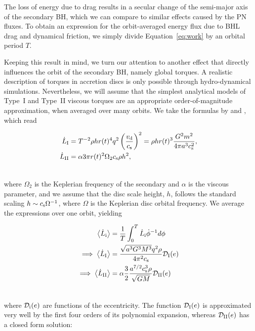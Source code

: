 \documentclass[usenatbib]{mnras}
\begin{document}
The loss of energy due to drag results in a secular change of the semi-major axis of the secondary BH, which we can compare to similar effects caused by the PN fluxes. To obtain an expression for the orbit-averaged energy flux due to BHL drag and dynamical friction, we simply divide Equation~\eqref{eq:work} by an orbital period $T$.

Keeping this result in mind, we turn our attention to another effect that directly influences the orbit of the secondary BH, namely global torques. A realistic description of torques in accretion discs is only possible through hydro-dynamical simulations. Nevertheless, we will assume that the simplest analytical models of Type~I and Type~II viscous torques are an appropriate order-of-magnitude approximation, when averaged over many orbits. We take the formulas by \cite{2002ApJ...565.1257T} and \citet{2020arXiv200511333D}, which read

\begin{align}
    \dot{L}_{\rm I} &=T^{-2} \rho h r(t)^4 q^2 \left(\frac{v_{\rm d}}{c_{\rm s}}\right)^2 =  \rho h r(t)^3 \frac{G^2 m^2}{4 \pi a^3 c_{\rm s}^2}, \\
    \dot{L}_{\rm {II}}&= \alpha 3 \pi r(t)^2 \Omega _2 c_{\rm s} \rho h^2,\\ \nonumber
\end{align}

\noindent where $\Omega_2$ is the Keplerian frequency of the secondary and $\alpha$ is the viscous parameter, and we assume that the disc scale height, $h$, follows the standard scaling $h\sim c_{\rm s} \Omega ^{-1}$, where $\Omega$ is the Keplerian disc orbital frequency. We average the expressions over one orbit, yielding

\begin{align}
\left< \dot{L}_{\rm 
i} \right>  &= \frac{1}{T} \int_0^T\dot{L}_{\rm i} \dot{\phi}^{-1} d\phi \\
\implies \left< \dot{L}_{\rm I} \right> &= \frac{\sqrt{a^{3} G^{3} M^{3}} q^2 \rho }{4 \pi ^{2} c_{\rm s}}\mathcal{D}_{\rm I}(e)  \label{eq:typeI} \\
\implies \left< \dot{L}_{\rm II} \right> &=  \alpha  \frac{3}{2}\frac{ a^{7/2} c_{\rm s}^3 \rho }{\sqrt{G M}} \mathcal{D}_{\rm II}(e)  \label{eq:typeII}\\ \nonumber
\end{align}

\noindent where $\mathcal{D}_{\rm i}(e)$ are functions of the eccentricity. The function $\mathcal{D}_{\rm I}(e)$ is approximated very well by the first four orders of its polynomial expansion, whereas $\mathcal{D}_{\rm {II}}(e)$ has a closed form solution:
\end{document}
